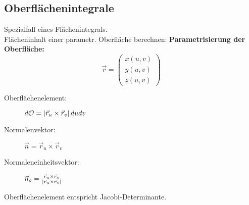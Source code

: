 \subsection{Oberflächenintegrale}
    Spezialfall eines Flächenintegrals.\\    
    Flächeninhalt einer parametr. Oberfläche berechnen:
    \textbf{Parametrisierung der Oberfläche:}
    $$
        \vec{r} = \begin{pmatrix}
            x(u,v)\\
            y(u,v)\\
            z(u,v)
        \end{pmatrix}
    $$
    \vspace*{0.0em}
    \begin{description}
        \item[Oberflächenelement:] $d\mathcal{O} = \abs*{\vec{r}_u \times \vec{r}_v} du dv$
        \item[Normalenvektor:]  $\vec{n} = \vec{r}_u \times \vec{r}_v$
        \item[Normaleneinheitsvektor:]  $\vec{n}_o = \frac{\vec{r}_u \times \vec{r}_v}{\abs*{\vec{r}_u \times \vec{r}_v}}$
    \end{description}
    {\small Oberflächenelement entspricht Jacobi-Determinante.}
